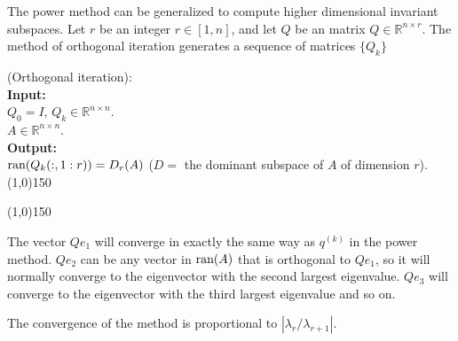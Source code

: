 The power method can be generalized to compute higher dimensional invariant subspaces.
Let $r$ be an integer $r\in[1,n]$, and let $Q$ be an matrix $Q\in\mathbb R^{n\times r}$.
The method of orthogonal iteration generates a sequence of matrices $\{ Q_k \}$
%
%
\begin{algo}
{
%
	(Orthogonal iteration):
%
}\\
\textbf{Input: }
{
%
	\\$Q_0=I,\,Q_k\in\mathbb R^{n\times n}$.
	\\$A\in\mathbb R^{n\times n}$.
%
}\\
\textbf{Output: }
{
%
	\\$\text{ran}({Q_k(:,1:r)})=D_r(A)$ ($D=$ the dominant subspace of $A$ of dimension $r$).
%
}\\
\line(1,0){150}
\begin{algorithmic}
%
\EndFor{}
%
\end{algorithmic}
\line(1,0){150}
\label{algOrthoIi}
\end{algo}
%
%
The vector $Qe_1$ will converge in exactly the same way as $q^{(k)}$ in the power method.
$Qe_2$ can be any vector in $\text{ran}({A})$ that is orthogonal to $Qe_1$, so it will normally converge to
the eigenvector with the second largest eigenvalue. 
$Qe_3$ will converge to the eigenvector with the third largest eigenvalue and so on.

The convergence of the method is proportional to $|\lambda_r/\lambda_{r+1}|$.

